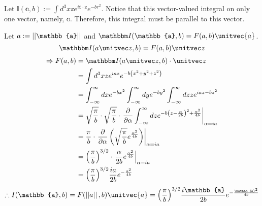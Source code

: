 \item

Let $\mathbb{I}(\mathbb{a}, b) := \int d^3x \mathbb{x} e^{i\mathbb{a} \cdot \mathbb{x}} e^{-br^2}$.
Notice that this vector-valued integral on only one vector, namely, $\mathbb{a}$.
Therefore, this integral must be parallel to this vector.

Let $a := \norm{\mathbb{a}}$ and $\mathbb{I}(\mathbb{a}, b) = F(a, b) \unitvec{a}$.
\[
	\mathbb{I}(a \zhat, b)
	= F(a, b) \zhat
\]
\begin{align*}
	\Rightarrow F(a, b)
	&= \mathbb{I}(a \zhat, b) \cdot \zhat \\
	&= \int d^3 x z e^{iaz} e^{-b \left( x^2 + y^2 + z^2 \right)} \\
	&= \int_{-\infty}^{\infty} dx e^{-bx^2}
	   \int_{-\infty}^{\infty} dy e^{-by^2}
	   \int_{-\infty}^{\infty} dz z e^{iaz - bz^2} \\
	&= \sqrt{\frac{\pi}{b}} \cdot \sqrt{\frac{\pi}{b}} \cdot
	   \evalAt{
		\partialderiv{\alpha} \int_{-\infty}^{\infty} dz e^{-b{\left( z - \frac{\alpha}{2b} \right)}^2 + \frac{\alpha^2}{4b}}
	   }{\alpha = ia} \\
	&= \frac{\pi}{b} \cdot \evalAt{
		\partialderiv{\alpha} \left(
			\sqrt{\frac{\pi}{b}} e^{\frac{\alpha^2}{4b}}
		\right)
	}{\alpha = ia} \\
	&= {\left( \frac{\pi}{b} \right)}^{3/2} \cdot \evalAt{
		\frac{\alpha}{2b} e^{\frac{\alpha^2}{4b}}
	}{\alpha = ia} \\
	&= {\left( \frac{\pi}{b} \right)}^{3/2} \frac{ia}{2b} e^{-\frac{a^2}{4b}}
\end{align*}
\[
	\therefore I(\mathbb{a}, b)
	= F(\norm{a}, b) \unitvec{a}
	= {\left( \frac{\pi}{b} \right)}^{3/2} \frac{i\mathbb{a}}{2b} e^{-\frac{\mathbb{a}^2}{4b}}
\]